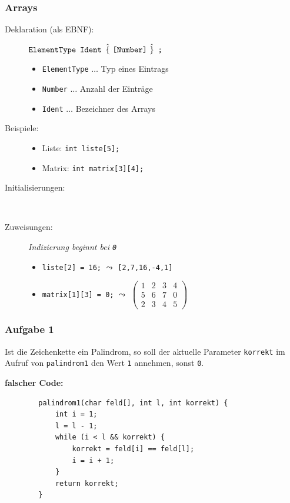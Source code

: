 \documentclass{beamer}
\newcommand{\wdh}[1]{\hat{\{} \ #1 \ \hat{\}}}
\begin{document}
\begin{frame} \frametitle{Arrays}
	\begin{description}
		\item[Deklaration (als EBNF):]
		$\texttt{ElementType} \enskip \texttt{Ident} \enskip \wdh{\texttt{[} \texttt{Number} \texttt{]}}\enskip  \texttt{;}$ \vspace{-\baselineskip}
		\pause
		\begin{itemize}
			\item \texttt{ElementType} $\dots$ Typ eines Eintrags
			\item \texttt{Number} $\dots$ Anzahl der Einträge
			\item \texttt{Ident} $\dots$ Bezeichner des Arrays
		\end{itemize}
		\pause
		\item[Beispiele:]
		\begin{itemize}
			\item Liste: \lstinline{int liste[5];}
			\item Matrix: \lstinline{int matrix[3][4];}
		\end{itemize}
		\pause
		\item[Initialisierungen:] ~
		\pause
		\item[Zuweisungen:] \textit{Indizierung beginnt bei \texttt{0}}
		\begin{itemize}
			\item \lstinline{liste[2] = 16;} $\leadsto$ \lstinline{[2,7,16,-4,1]} 
			\item \lstinline{matrix[1][3] = 0;} $\leadsto$ $\left( \begin{smallmatrix} 1 & 2 & 3 & 4 \\ 5 & 6 & 7 & 0 \\ 2 & 3 & 4 & 5 \end{smallmatrix} \right)$
		\end{itemize}
	\end{description}
\end{frame}

\begin{frame}[fragile] \frametitle{Aufgabe 1}
	
	Ist die Zeichenkette ein Palindrom, so soll der aktuelle Parameter \texttt{korrekt} im Aufruf von \texttt{palindrom1}
	den Wert \texttt{1} annehmen, sonst \texttt{0}.
	
	\textbf{falscher Code:}
	\begin{lstlisting}
		palindrom1(char feld[], int l, int korrekt) {
			int i = 1;
			l = l - 1;
			while (i < l && korrekt) {
				korrekt = feld[i] == feld[l];
				i = i + 1;
			}
			return korrekt;
		}
	\end{lstlisting}
\end{frame}
\end{document}
